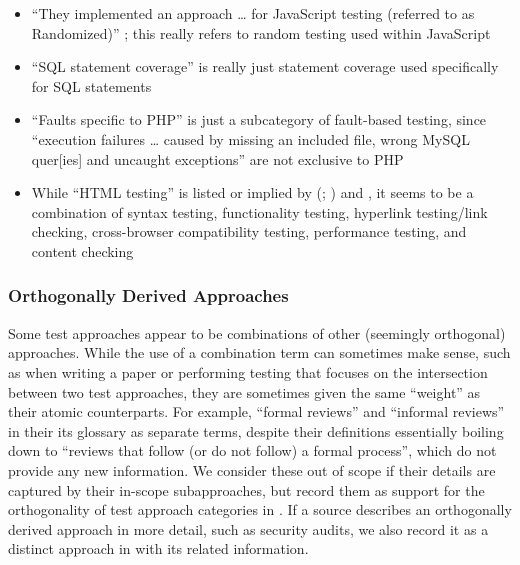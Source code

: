     \begin{itemize}
        \item ``They implemented an approach \dots{} for JavaScript testing
              (referred to as Randomized)'' \citep[p.~192]{DoğanEtAl2014};
              this really refers to random testing used within JavaScript
        \item ``SQL statement coverage'' is really just statement coverage
              used specifically for SQL statements \citep[Tab.~13]{DoğanEtAl2014}
        \item ``Faults specific to PHP'' is just a subcategory of fault-based
              testing, since ``execution failures \dots{} caused by missing an
              included file, wrong MySQL quer[ies] and uncaught exceptions''
              are not exclusive to PHP \citep[Tab.~27]{DoğanEtAl2014}
        \item While ``HTML testing'' is listed or implied by
              \citeauthor{Gerrard2000a} (\citeyear[Tab.~2]{Gerrard2000a};
              \citeyear[Tab.~1, p.~3]{Gerrard2000b}) and
              \citet[p.~220]{Patton2006}, it seems to be a combination of syntax
              testing, functionality testing, hyperlink testing/link checking,
              cross-browser compatibility testing, performance testing, and
              content checking \citep[p.~3]{Gerrard2000b}
    \end{itemize}

    \subsubsection{Orthogonally Derived Approaches}
    \label{orth-test}
    Some test approaches appear to be combinations of other (seemingly
    orthogonal) approaches. While the use of a combination term can sometimes
    make sense, such as when writing a paper or performing testing that focuses
    on the intersection between two test approaches, they are sometimes given
    the same ``weight'' as their atomic counterparts. For example, \citetISTQB{}
     ``formal reviews'' and ``informal reviews'' in
    \ifnotpaper their \else its \fi glossary as separate terms, despite their
    definitions essentially boiling down to ``reviews that follow (or do not
    follow) a formal process'', which do not provide any new information.
    We consider these out of scope if their details are captured by their
    in-scope subapproaches, but record them as support for the orthogonality of
    test approach categories in . If a source describes an
    orthogonally derived approach in more detail, such as security audits, we
    also record it as a distinct approach in \ourApproachGlossary{} with its
    related information.

